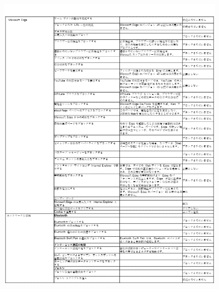 \begin{figure}[htbp]
    \centering
    \vspace{-1cm}
    \includegraphics[width=17cm]{figures/IntuneforEducation-02.png}
\end{figure}

